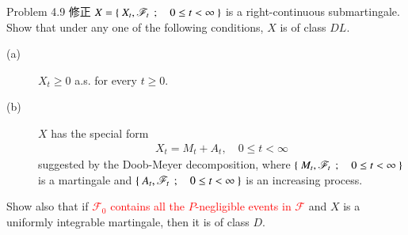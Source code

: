	\begin{itembox}[l]{Problem 4.9 修正}
		$X = \left\{\ X_t,\mathscr{F}_t\ \, ; \quad 0 \leq t < \infty\ \right\}$ is a right-continuous submartingale.
		Show that under any one of the following conditions, $X$ is of class $DL$.
		\begin{description}
			\item[(a)] $X_t \geq 0$ a.s. for every $t \geq 0$.
			\item[(b)] $X$ has the special form
				\begin{align}
					X_t = M_t + A_t, \quad 0 \leq t < \infty
				\end{align}
				suggested by the Doob-Meyer decomposition, where $\left\{\ M_t,\mathscr{F}_t\ \, ; \quad 0 \leq t < \infty\ \right\}$
				is a martingale and $\left\{\ A_t,\mathscr{F}_t\ \, ; \quad 0 \leq t < \infty\ \right\}$ is an increasing process.
		\end{description}
		Show also that if \textcolor{red}{$\mathscr{F}_0$ contains all the $P$-negligible events in $\mathscr{F}$} and
		$X$ is a uniformly integrable martingale, then it is of class $D$.
	\end{itembox}
	
